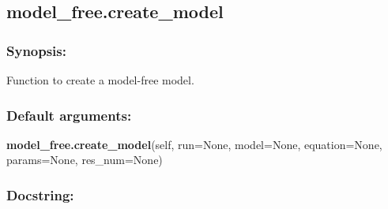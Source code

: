 \newpage

\subsection{model\_free.create\_model}


\subsubsection{Synopsis:}

Function to create a model-free model.

\subsubsection{Default arguments:}

\textsf{\textbf{model\_free.create\_model}(self, run=None, model=None, equation=None, params=None, res\_num=None)
}


\subsubsection{Docstring:}

